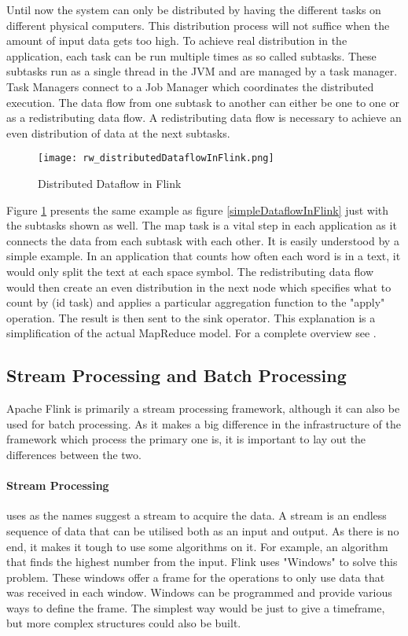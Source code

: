 Until now the system can only be distributed by having the different tasks on different physical computers. This distribution process will not suffice when the amount of input data gets too high. To achieve real distribution in the application, each task can be run multiple times as so called subtasks. These subtasks run as a single thread in the JVM and are managed by a task manager. Task Managers connect to a Job Manager which coordinates the distributed execution. The data flow from one subtask to another can either be one to one or as a redistributing data flow. A redistributing data flow is necessary to achieve an even distribution of data at the next subtasks.

\begin{figure}[h]
    \centering
      \texttt{[image: rw\_distributedDataflowInFlink.png]}
      \caption{Distributed Dataflow in Flink}
      \label{distributedDataflowInFlink}
\end{figure}

Figure \ref{distributedDataflowInFlink} presents the same example as figure \ref{simpleDataflowInFlink} just with the subtasks shown as well. The map task is a vital step in each application as it connects the data from each subtask with each other. It is easily understood by a simple example.
In an application that counts how often each word is in a text, it would only split the text at each space symbol. The redistributing data flow would then create an even distribution in the next node which specifies what to count by (id task) and applies a particular aggregation function to the "apply" operation. The result is then sent to the sink operator. This explanation is a simplification of the actual MapReduce model. For a complete overview see \cite{dean2008mapreduce}.

\subsection{Stream Processing and Batch Processing}

Apache Flink is primarily a stream processing framework, although it can also be used for batch processing. As it makes a big difference in the infrastructure of the framework which process the primary one is, it is important to lay out the differences between the two.

\paragraph{Stream Processing} uses as the names suggest a stream to acquire the data. A stream is an endless sequence of data that can be utilised both as an input and output. As there is no end, it makes it tough to use some algorithms on it. For example, an algorithm that finds the highest number from the input. Flink uses "Windows" to solve this problem. These windows offer a frame for the operations to only use data that was received in each window. Windows can be programmed and provide various ways to define the frame. The simplest way would be just to give a timeframe, but more complex structures could also be built.

